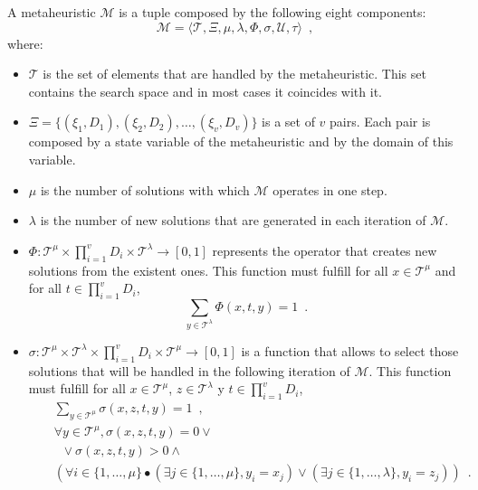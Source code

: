 \begin{definition}[Metaheuristic]
	\label{def:Metaheuristic} A metaheuristic $\mathcal{M}$ is a tuple composed by the following eight components:
	\begin{equation}
	\mathcal{M} = \langle \mathcal{T}, \Xi, \mu, \lambda, \Phi, \sigma, \mathcal{U}, \tau \rangle \enspace ,
	\end{equation}
	where:
	
	\begin{itemize}
		\item $\mathcal{T}$ is the set of elements that are handled by the metaheuristic. This set contains the search space and in most cases it coincides with it.
	
		\item $\Xi = \{ (\xi_1,D_1), (\xi_2, D_2), \ldots, (\xi_v, D_v) \}$ is a set of $v$ pairs. Each pair is composed by a state variable of the metaheuristic and by the domain of this variable.
		
		\item  $\mu$ is the number of solutions with which $\mathcal{M}$ operates in one step.
		
		\item $\lambda$ is the number of new solutions that are generated in each iteration of $\mathcal{M}$.
				
		\item $\Phi: \mathcal{T}^\mu \times \prod\limits_{i=1}^{v} D_i \times \mathcal{T}^\lambda \rightarrow [0,1]$ represents the operator that creates new solutions from the existent ones. This function must fulfill for all $x \in
		\mathcal{T}^\mu$ and for all $t \in \prod_{i=1}^{v} D_i$,
		\begin{equation}
		\label{eq:metah-phi} \sum_{y \in \mathcal{T}^\lambda} \Phi (x,t,y) = 1 \enspace .
		\end{equation}
		
		\item $\sigma: \mathcal{T}^\mu \times \mathcal{T}^\lambda \times \prod\limits_{i=1}^{v} D_i \times \mathcal{T}^{\mu}
		\rightarrow [0,1]$ is a function that allows to select those solutions that will be handled in the following iteration of  $\mathcal{M}$. This function must fulfill for all $x \in \mathcal{T}^{\mu}$, $z \in
		\mathcal{T}^{\lambda}$ y $t \in \prod_{i=1}^{v} D_i$,
		\begin{eqnarray}
		& & \sum_{y \in \mathcal{T}^\mu} \sigma (x,z,t,y) = 1 \enspace , \\
		& & \forall y \in \mathcal{T}^\mu, \sigma(x,z,t,y) = 0 \vee \\
		& & \nonumber \;\; \vee \sigma(x,z,t,y) > 0 \wedge  \\
		& & \nonumber (\forall i \in \{1,\ldots,\mu\} \bullet (\exists j \in \{1,\ldots,\mu\}, y_i=x_j) \vee (\exists j \in
		\{1,\ldots,\lambda\}, y_i=z_j)) \enspace .
		\end{eqnarray}
		

\end{itemize}
\end{definition}
